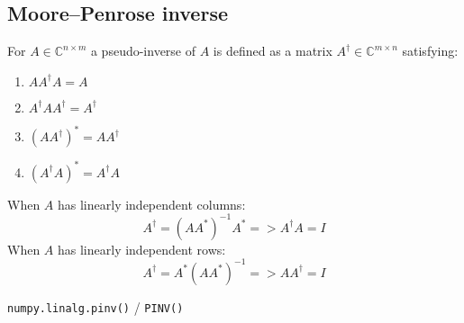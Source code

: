 \subsection{Moore--Penrose inverse}
For $A \in \mathbb{C}^{n \times m}$  a pseudo-inverse of $A$ is defined as a matrix 
$ A^{\dagger} \in \mathbb{C}^{m \times n}$ satisfying:

\begin{multicols}{2}
	\begin{enumerate}
 	 \item $AA^{\dagger}A = A$
 	 \item $A^{\dagger}AA^{\dagger} = A^{\dagger}$
	  \item $(AA^{\dagger})^{*} = AA^{\dagger}$
	  \item $(A^{\dagger}A)^{*} = A^{\dagger}A$
	\end{enumerate}
\end{multicols}

When $A$ has linearly independent columns: \\
$$A^{\dagger} = (AA^*)^{-1}A^* => A^{\dagger}A = I$$
When $A$ has linearly independent rows: \\
$$A^{\dagger} = A^*(AA^*)^{-1} => AA^{\dagger} = I$$

\texttt{numpy.linalg.pinv()} / \texttt{PINV()}
